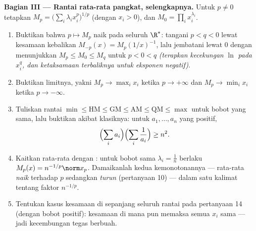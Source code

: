 \begin{problem}
\medskip
\noindent\textbf{Bagian III --- Rantai rata-rata pangkat, selengkapnya.}
Untuk $p \neq 0$ tetapkan $M_p = \bigl(\sum_i\lambda_i
x_i^p\bigr)^{1/p}$ (dengan $x_i > 0$), dan $M_0 = \prod_i
x_i^{\lambda_i}$.
\begin{enumerate}[resume]
  \item Buktikan bahwa $p \mapsto M_p$ naik pada seluruh
        $\R^*$: tangani $p < q < 0$ lewat kesamaan kebalikan
        $M_{-p}(x) = M_p(1/x)^{-1}$, lalu jembatani lewat $0$ dengan
        menunjukkan $M_p \leq M_0 \leq M_q$ untuk $p < 0 < q$
        \emph{(terapkan kecekungan $\ln$ pada $x_i^q$, dan
        ketaksamaan terbaliknya untuk eksponen negatif)}.
  \item Buktikan limitnya, yakni $M_p \to \max_i x_i$ ketika $p \to
        +\infty$ dan $M_p \to \min_i x_i$ ketika $p \to -\infty$.
  \item Tuliskan rantai $\min \leq \mathrm{HM} \leq
        \mathrm{GM} \leq \mathrm{AM} \leq \mathrm{QM} \leq
        \max$ untuk bobot yang sama, lalu buktikan akibat
        klasiknya: untuk $a_1, \dots, a_n$ yang positif,
        \[
        \Bigl(\sum_i a_i\Bigr)\Bigl(\sum_i\frac1{a_i}\Bigr)
        \geq n^2 .
        \]
  \item Kaitkan rata-rata dengan : untuk bobot sama $\lambda_i =
        \frac1n$ berlaku $M_p(x) = n^{-1/p}\norm x_p$. Damaikanlah
        kedua kemonotonannya --- rata-rata \emph{naik} terhadap $p$
        sedangkan  \emph{turun} (pertanyaan 10) --- dalam satu
        kalimat tentang faktor $n^{-1/p}$.
  \item Tentukan kasus kesamaan di sepanjang seluruh rantai pada
        pertanyaan 14 (dengan bobot positif): kesamaan di mana pun
        memaksa semua $x_i$ sama --- jadi kecembungan tegas berbuah.
\end{enumerate}


\end{problem}
